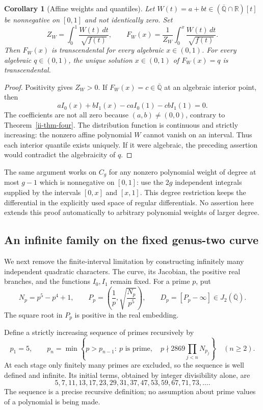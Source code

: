 \documentclass[11pt,a4paper]{article}
\newtheorem{corollary}[theorem]{Corollary}
\theoremstyle{definition}
\theoremstyle{remark}
\numberwithin{equation}{section}
\newcommand{\Qbar}{\overline{\mathbb Q}}
\begin{document}
\begin{corollary}[Affine weights and quantiles]
\label{ii-cor-cdf}
Let $W(t)=a+bt\in(\Qbar\cap\mathbb R)[t]$ be nonnegative on $[0,1]$
and not identically zero.  Set
\[
 Z_W=\int_0^1\frac{W(t)\,dt}{\sqrt{f(t)}},\qquad
 F_W(x)=\frac1{Z_W}\int_0^x\frac{W(t)\,dt}{\sqrt{f(t)}}.
\]
Then $F_W(x)$ is transcendental for every algebraic $x\in(0,1)$.
For every algebraic $q\in(0,1)$, the unique solution $x\in(0,1)$ of
$F_W(x)=q$ is transcendental.
\end{corollary}
\begin{proof}
Positivity gives $Z_W>0$.  If $F_W(x)=c\in\Qbar$ at an algebraic
interior point, then
\[
 aI_0(x)+bI_1(x)-caI_0(1)-cbI_1(1)=0.
\]
The coefficients are not all zero because $(a,b)\ne(0,0)$, contrary to
Theorem~\ref{ii-thm-four}.  The distribution function is continuous and
strictly increasing: the nonzero affine polynomial $W$ cannot vanish on
an interval.  Thus each interior quantile exists uniquely.  If it were
algebraic, the preceding assertion would contradict the algebraicity of
$q$.
\end{proof}

The same argument works on $C_g$ for any nonzero polynomial weight of
degree at most $g-1$ which is nonnegative on $[0,1]$: use the $2g$
independent integrals supplied by the intervals $[0,x]$ and $[x,1]$.
This degree restriction keeps the differential in the explicitly used
space of regular differentials.  No assertion here extends this proof
automatically to arbitrary polynomial weights of larger degree.

\subsection{An infinite family on the fixed genus-two curve}

We next remove the finite-interval limitation by constructing infinitely
many independent quadratic characters.  The curve, its Jacobian, the
positive real branches, and the functions $I_0,I_1$ remain fixed.
For a prime $p$, put
\begin{equation}\label{ii-eq-Np}
 N_p=p^5-p^4+1,\qquad
 P_p=\left(\frac1p,\sqrt{\frac{N_p}{p^5}}\right),\qquad
 D_p=[P_p-\infty]\in J_2(\Qbar).
\end{equation}
The square root in $P_p$ is positive in the real embedding.

Define a strictly increasing sequence of primes recursively by
\begin{equation}\label{ii-eq-prime-sequence}
 p_1=5,\qquad
 p_n=\min\left\{p>p_{n-1}:\ p\text{ is prime},\quad
             p\nmid2869\prod_{j<n}N_{p_j}\right\}\quad(n\ge2).
\end{equation}
At each stage only finitely many primes are excluded, so the sequence is
well defined and infinite.  Its initial terms, obtained by integer
divisibility alone, are
\[
 5,7,11,13,17,23,29,31,37,47,53,59,67,71,73,\ldots.
\]
The sequence is a precise recursive definition; no assumption about
prime values of a polynomial is being made.
\end{document}
